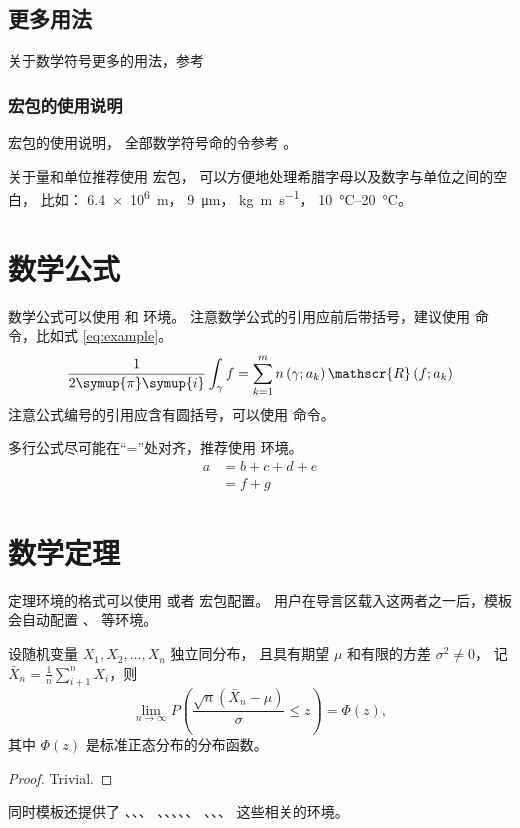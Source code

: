 \subsection{更多用法}
关于数学符号更多的用法，参考
\href{http://mirrors.ctan.org/macros/latex/contrib/unicode-math/unicode-math.pdf}{}

\subsubsection{宏包的使用说明}
宏包的使用说明，
全部数学符号命的令参考
\href{http://mirrors.ctan.org/macros/latex/contrib/unicode-math/unimath-symbols.pdf}{}。


关于量和单位推荐使用
\href{http://mirrors.ctan.org/macros/latex/contrib/siunitx/siunitx.pdf}{}
宏包，
可以方便地处理希腊字母以及数字与单位之间的空白，
比如：
\SI{6.4e6}{m}，
\SI{9}{\micro\meter}，
\si{kg.m.s^{-1}}，
\SIrange{10}{20}{\degreeCelsius}。



\section{数学公式}

数学公式可以使用  和  环境。
注意数学公式的引用应前后带括号，建议使用  命令，比如式 \eqref{eq:example}。
\begin{equation}
  \frac{1}{2 \symup{\pi} \symup{i}} \int_\gamma f = \sum_{k=1}^m n\left(\gamma; a_k\right) \mathscr{R}\left(f; a_k\right)
  \label{eq:example}
\end{equation}
注意公式编号的引用应含有圆括号，可以使用  命令。

多行公式尽可能在“=”处对齐，推荐使用  环境。
\begin{align}
  a & = b + c + d + e \\
    & = f + g
\end{align}



\section{数学定理}

定理环境的格式可以使用  或者  宏包配置。
用户在导言区载入这两者之一后，模板会自动配置 、 等环境。

\begin{theorem}
  设随机变量 $X_1, X_2, \dots, X_n$ 独立同分布， 且具有期望 $\mu$ 和有限的方差 $\sigma^2 \ne 0$，
  记 $\bar{X}_n = \frac{1}{n} \sum_{i+1}^n X_i$，则
  \begin{equation}
    \lim_{n \to \infty} P \left(\frac{\sqrt{n} \left( \bar{X}_n - \mu \right)}{\sigma} \le z \right) = \Phi(z),
  \end{equation}
  其中 $\Phi(z)$ 是标准正态分布的分布函数。
\end{theorem}
\begin{proof}
  Trivial.
\end{proof}

同时模板还提供了 、、、
、、、、、
、、、 这些相关的环境。

\cleardoublepage
